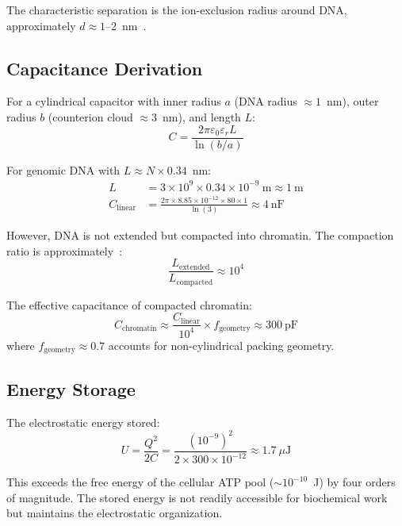 \documentclass[twocolumn,aps,prb,superscriptaddress,longbibliography,floatfix]{revtex4-2}
\theoremstyle{remark}
\begin{document}
The characteristic separation is the ion-exclusion radius around DNA,
approximately $d \approx 1$--2~nm~\cite{Bloomfield1997}.

\subsection{Capacitance Derivation}

For a cylindrical capacitor with inner radius $a$ (DNA radius $\approx 1$~nm),
outer radius $b$ (counterion cloud $\approx 3$~nm), and length $L$:
\begin{equation}
C = \frac{2\pi\varepsilon_0\varepsilon_r L}{\ln(b/a)}
\label{eq:cylinder_cap}
\end{equation}

For genomic DNA with $L \approx N \times 0.34$~nm:
\begin{align}
L &= 3 \times 10^9 \times 0.34 \times 10^{-9}~\text{m} \approx 1~\text{m} \\
C_\text{linear} &= \frac{2\pi \times 8.85 \times 10^{-12} \times 80 \times 1}{\ln(3)} \approx 4~\text{nF}
\end{align}

However, DNA is not extended but compacted into chromatin. The
compaction ratio is approximately~\cite{Luger1997}:
\begin{equation}
\frac{L_\text{extended}}{L_\text{compacted}} \approx 10^4
\end{equation}

The effective capacitance of compacted chromatin:
\begin{equation}
C_\text{chromatin} \approx \frac{C_\text{linear}}{10^4} \times f_\text{geometry} \approx 300~\text{pF}
\label{eq:dna_capacitance}
\end{equation}
where $f_\text{geometry} \approx 0.7$ accounts for non-cylindrical
packing geometry.

\subsection{Energy Storage}

The electrostatic energy stored:
\begin{equation}
U = \frac{Q^2}{2C} = \frac{(10^{-9})^2}{2 \times 300 \times 10^{-12}} \approx 1.7~\mu\text{J}
\label{eq:stored_energy}
\end{equation}

This exceeds the free energy of the cellular ATP pool
($\sim 10^{-10}$~J) by four orders of magnitude. The stored energy is
not readily accessible for biochemical work but maintains the
electrostatic organization.
\end{document}
